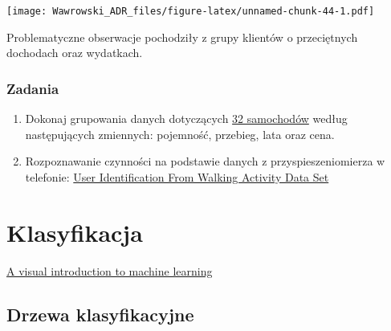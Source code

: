 \documentclass[]{book}
\newenvironment{Shaded}{\begin{snugshade}}{\end{snugshade}}
\newcommand{\KeywordTok}[1]{\textcolor[rgb]{0.13,0.29,0.53}{\textbf{#1}}}
\newcommand{\DataTypeTok}[1]{\textcolor[rgb]{0.13,0.29,0.53}{#1}}
\newcommand{\StringTok}[1]{\textcolor[rgb]{0.31,0.60,0.02}{#1}}
\newcommand{\OperatorTok}[1]{\textcolor[rgb]{0.81,0.36,0.00}{\textbf{#1}}}
\newcommand{\NormalTok}[1]{#1}
\begin{document}
\begin{Shaded}
\end{Shaded}

\texttt{[image: Wawrowski\_ADR\_files/figure-latex/unnamed-chunk-44-1.pdf]}

Problematyczne obserwacje pochodziły z grupy klientów o przeciętnych
dochodach oraz wydatkach.

\subsection{Zadania}\label{zadania}

\begin{enumerate}
\def\labelenumi{\arabic{enumi}.}
\item
  Dokonaj grupowania danych dotyczących \href{data/auta.csv}{32
  samochodów} według następujących zmiennych: pojemność, przebieg, lata
  oraz cena.
\item
  Rozpoznawanie czynności na podstawie danych z przyspieszeniomierza w
  telefonie:
  \href{http://archive.ics.uci.edu/ml/datasets/User+Identification+From+Walking+Activity\#}{User
  Identification From Walking Activity Data Set}
\end{enumerate}

\chapter{Klasyfikacja}\label{klasyfikacja}

\href{http://www.r2d3.us/visual-intro-to-machine-learning-part-1/}{A
visual introduction to machine learning}

\section{Drzewa klasyfikacyjne}\label{drzewa-klasyfikacyjne}
\end{document}
